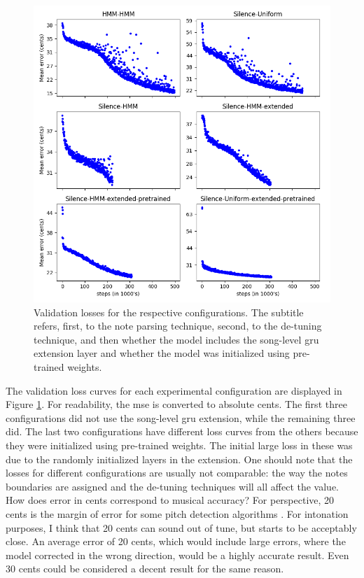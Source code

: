 \begin{figure}[h!]
    \centering
    \includegraphics[width=\columnwidth]{figures/losses_plots.png}
    \caption{Validation losses for the respective configurations. The subtitle refers, first, to the note parsing technique, second, to the de-tuning technique, and then whether the model includes the song-level \gls{gru} extension layer and whether the model was initialized using pre-trained weights.}
    \label{fig:losses_plots}
\end{figure}
The validation loss curves for each experimental configuration are displayed in Figure \ref{fig:losses_plots}. For readability, the \gls{mse} is converted to absolute cents. The first three configurations did not use the song-level \gls{gru} extension, while the remaining three did. The last two configurations have different loss curves from the others because they were initialized using pre-trained weights. The initial large loss in these was due to the randomly initialized layers in the extension. One should note that the losses for different configurations are usually not comparable: the way the notes boundaries are assigned and the de-tuning techniques will all affect the value. How does error in cents correspond to musical accuracy? For perspective, 20 cents is the margin of error for some pitch detection algorithms \cite{kim2018crepe}. For intonation purposes, I think that 20 cents can sound out of tune, but starts to be acceptably close. An average error of 20 cents, which would include large errors, where the model corrected in the wrong direction, would be a highly accurate result. Even 30 cents could be considered a decent result for the same reason. 

